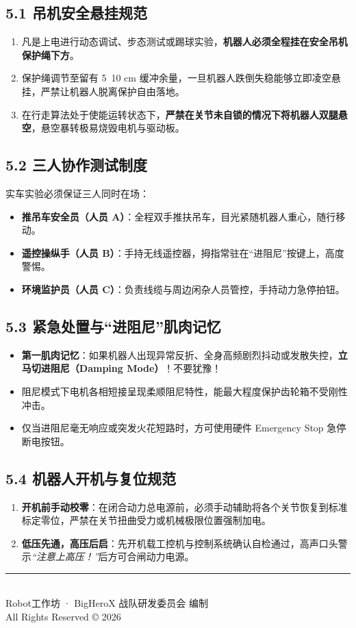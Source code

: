 \documentclass[11pt,a4paper]{ctexart}
\begin{document}
\subsection{5.1 吊机安全悬挂规范}
\begin{enumerate}[leftmargin=*]
    \item 凡是上电进行动态调试、步态测试或踢球实验，\textbf{机器人必须全程挂在安全吊机保护绳下方}。
    \item 保护绳调节至留有 5~10 cm 缓冲余量，一旦机器人跌倒失稳能够立即凌空悬挂，严禁让机器人脱离保护自由落地。
    \item 在行走算法处于使能运转状态下，\textbf{严禁在关节未自锁的情况下将机器人双腿悬空}，悬空暴转极易烧毁电机与驱动板。
\end{enumerate}

\subsection{5.2 三人协作测试制度}
实车实验必须保证三人同时在场：
\begin{itemize}[leftmargin=*]
    \item \textbf{推吊车安全员（人员 A）}：全程双手推扶吊车，目光紧随机器人重心，随行移动。
    \item \textbf{遥控操纵手（人员 B）}：手持无线遥控器，拇指常驻在“进阻尼”按键上，高度警惕。
    \item \textbf{环境监护员（人员 C）}：负责线缆与周边闲杂人员管控，手持动力急停拍钮。
\end{itemize}

\subsection{5.3 紧急处置与“进阻尼”肌肉记忆}
\begin{itemize}[leftmargin=*]
    \item \textbf{第一肌肉记忆}：如果机器人出现异常反折、全身高频剧烈抖动或发散失控，\textbf{立马切进阻尼（Damping Mode）}！不要犹豫！
    \item 阻尼模式下电机各相短接呈现柔顺阻尼特性，能最大程度保护齿轮箱不受刚性冲击。
    \item 仅当进阻尼毫无响应或突发火花短路时，方可使用硬件 Emergency Stop 急停断电按钮。
\end{itemize}

\subsection{5.4 机器人开机与复位规范}
\begin{enumerate}[leftmargin=*]
    \item \textbf{开机前手动校零}：在闭合动力总电源前，必须手动辅助将各个关节恢复到标准标定零位，严禁在关节扭曲受力或机械极限位置强制加电。
    \item \textbf{低压先通，高压后启}：先开机载工控机与控制系统确认自检通过，高声口头警示\textit{“注意上高压！”}后方可合闸动力电源。
\end{enumerate}

\vspace{1.5cm}
\begin{center}
    \rule{0.6\textwidth}{0.5pt}\\[0.3cm]
    {\small \textsf{Robot工作坊 · BigHeroX 战队研发委员会 编制}}\\[0.1cm]
    {\footnotesize \textsf{All Rights Reserved © 2026}}
\end{center}
\end{document}
